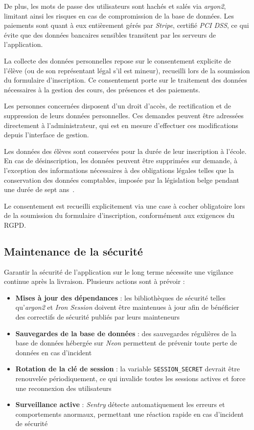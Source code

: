 \documentclass{article}
\begin{document}
De plus, les mots de passe des utilisateurs sont hachés et salés 
via \textit{argon2}, limitant ainsi les risques en cas de 
compromission de la base de données. Les paiements sont quant 
à eux entièrement gérés par \textit{Stripe}, certifié 
\textit{PCI DSS}, ce qui évite que des données bancaires 
sensibles transitent par les serveurs de l'application.

La collecte des données personnelles repose sur le consentement 
explicite de l'élève (ou de son représentant légal s'il est mineur), 
recueilli lors de la soumission du formulaire d'inscription. 
Ce consentement porte sur le traitement des données nécessaires 
à la gestion des cours, des présences et des paiements.

Les personnes concernées disposent d'un droit d'accès, de 
rectification et de suppression de leurs données personnelles. 
Ces demandes peuvent être adressées directement à l'administrateur, 
qui est en mesure d'effectuer ces modifications depuis l'interface 
de gestion.

Les données des élèves sont conservées pour la durée de leur 
inscription à l'école. En cas de désinscription, les données 
peuvent être supprimées sur demande, à l'exception des informations 
nécessaires à des obligations légales telles que la conservation 
des données comptables, imposée par la 
législation belge pendant une durée de sept ans~\cite{cde}.

Le consentement est recueilli explicitement via une case à cocher 
obligatoire lors de la soumission du formulaire d'inscription, 
conformément aux exigences du RGPD.

\subsection{Maintenance de la sécurité}

Garantir la sécurité de l'application sur le long terme nécessite 
une vigilance continue après la livraison. Plusieurs actions 
sont à prévoir :

\begin{itemize}
    \item \textbf{Mises à jour des dépendances} : les bibliothèques 
    de sécurité telles qu'\textit{argon2} et \textit{Iron Session} 
    doivent être maintenues à jour afin de bénéficier des correctifs 
    de sécurité publiés par leurs mainteneurs
    \item \textbf{Sauvegardes de la base de données} : des sauvegardes 
    régulières de la base de données hébergée sur \textit{Neon} 
    permettent de prévenir toute perte de données en cas d'incident
    \item \textbf{Rotation de la clé de session} : la variable 
    \texttt{SESSION\_SECRET} devrait être renouvelée périodiquement, 
    ce qui invalide toutes les sessions actives et force une 
    reconnexion des utilisateurs
    \item \textbf{Surveillance active} : \textit{Sentry} détecte 
    automatiquement les erreurs et comportements anormaux, 
    permettant une réaction rapide en cas d'incident de sécurité
\end{itemize}
\end{document}
